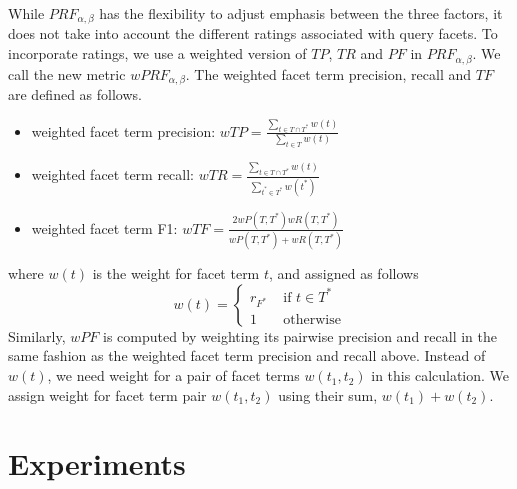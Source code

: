 While $PRF_{\alpha,\beta}$ has the flexibility to adjust emphasis between the three factors, it does not take into account the different ratings associated with query facets. To incorporate ratings, we use a weighted version of $T\!P$, $T\!R$ and $P\!F$ in $PRF_{\alpha,\beta}$. We call the new metric $wPRF_{\alpha,\beta}$. The weighted facet term precision, recall and $T\!F$ are defined as follows.
\begin{itemize}
 \item weighted facet term precision: $wT\!P=\frac{\sum_{t \in T \cap T^*}{w(t)}}{\sum_{t \in T}{w(t)}}$
 \item weighted facet term recall: $wT\!R=\frac{\sum_{t \in T \cap T^*}{w(t)}}{\sum_{t^* \in T^*}{w(t^*)}}$ 
  \item weighted facet term F1: $wT\!F=\frac{2wP(T,T^*)wR(T,T^*)}{wP(T,T^*)+wR(T,T^*)}$ 
\end{itemize}
where $w(t)$ is the weight for facet term $t$, and assigned as follows
$$
w(t) = \left\{ \begin{array}{rl}
r_{F^*} &\mbox{ if $t \in T^*$} \\
1 &\mbox{ otherwise}
\end{array} \right.
$$
Similarly, $wP\!F$ is computed by weighting its pairwise precision and recall in the same fashion as the weighted facet term precision and recall above.
Instead of $w(t)$, we need weight for a pair of facet terms $w(t_1,t_2)$ in this calculation.
We assign weight for facet term pair $w(t_1, t_2)$ using their sum, $w(t_1) + w(t_2)$.


\section{Experiments}
\label{sec:ie-exp}
